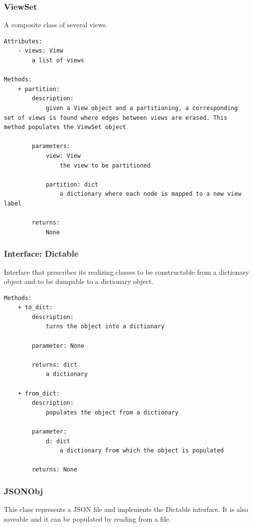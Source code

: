\documentclass[12pt]{extarticle}
\begin{document}
\subsubsection{ViewSet}

A composite class of several views.

\begin{lstlisting}
Attributes:
    - views: View
        a list of views
        
Methods:
    + partition:
        description:
            given a View object and a partitioning, a corresponding set of views is found where edges between views are erased. This method populates the ViewSet object
        
        parameters:
            view: View
                the view to be partitioned
            
            partition: dict
                a dictionary where each node is mapped to a new view label
        
        returns:
            None
\end{lstlisting}

\subsubsection{Interface: Dictable}

Interface that prescribes its realizing classes to be constructable from a dictionary object and to be dumpable to a dictionary object.

\begin{lstlisting}
Methods:
    + to_dict:
        description:
            turns the object into a dictionary
        
        parameter: None
        
        returns: dict
            a dictionary

    + from_dict:
        description:
            populates the object from a dictionary
        
        parameter: 
            d: dict
                a dictionary from which the object is populated
        
        returns: None
\end{lstlisting}


\subsubsection{JSONObj}

This class represents a JSON file and implements the Dictable interface. It is also saveable and it can be populated by reading from a file.
\end{document}
